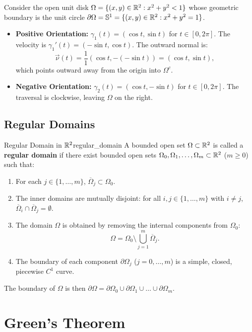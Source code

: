 \begin{exemple}
Consider the open unit disk $\Omega = \{ (x,y) \in \mathbb{R}^2 : x^2 + y^2 < 1 \}$ whose geometric boundary is the unit circle $\partial\Omega = \mathbb{S}^1 = \{ (x,y) \in \mathbb{R}^2 : x^2 + y^2 = 1 \}$.
\begin{itemize}
    \item \textbf{Positive Orientation:} $\gamma_1(t) = (\cos t, \sin t)$ for $t \in [0, 2\pi]$. The velocity is $\gamma_1'(t) = (-\sin t, \cos t)$. The outward normal is:
    \[\vec{\nu}(t) = \frac{1}{1} (\cos t, -(-\sin t)) = (\cos t, \sin t),\]
    which points outward away from the origin into $\Omega^c$.
    \item \textbf{Negative Orientation:} $\gamma_2(t) = (\cos t, -\sin t)$ for $t \in [0, 2\pi]$. The traversal is clockwise, leaving $\Omega$ on the right.
\end{itemize}
\end{exemple}

\subsection{Regular Domains}

\begin{definition}{Regular Domain in $\mathbb{R}^2$}{regular_domain}
A bounded open set $\Omega \subset \mathbb{R}^2$ is called a \textbf{regular domain} if there exist bounded open sets $\Omega_0, \Omega_1, \dots, \Omega_m \subset \mathbb{R}^2$ ($m \ge 0$) such that:
\begin{enumerate}
    \item For each $j \in \{1, \dots, m\}$, $\overline{\Omega}_j \subset \Omega_0$.
    \item The inner domains are mutually disjoint: for all $i, j \in \{1, \dots, m\}$ with $i \neq j$, $\overline{\Omega}_i \cap \overline{\Omega}_j = \emptyset$.
    \item The domain $\Omega$ is obtained by removing the internal components from $\Omega_0$:
    \[\Omega = \Omega_0 \setminus \bigcup_{j=1}^m \overline{\Omega}_j.\]
    \item The boundary of each component $\partial\Omega_j$ ($j = 0, \dots, m$) is a simple, closed, piecewise $C^1$ curve.
\end{enumerate}
The boundary of $\Omega$ is then $\partial\Omega = \partial\Omega_0 \cup \partial\Omega_1 \cup \dots \cup \partial\Omega_m$.
\end{definition}

\section{Green's Theorem}

